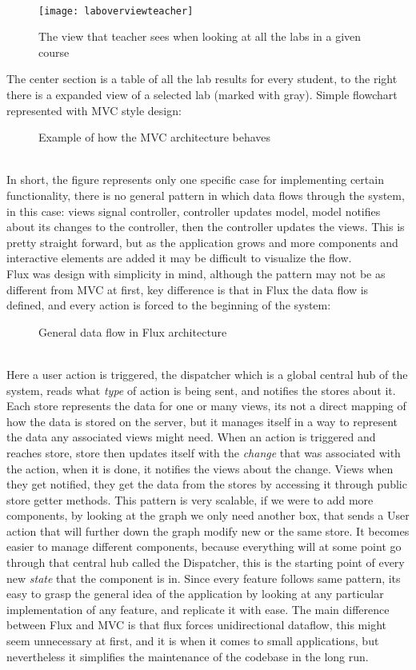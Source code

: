 \\
\begin{figure}[h]
  {\texttt{[image: laboverviewteacher]}}
  \caption{The view that teacher sees when looking at all the labs in a given course}
  \label{fig:laboverviewteacher}
\end{figure}
The center section is a table of all the lab results for every student, to the right there is a expanded view of a selected lab (marked with gray).
Simple flowchart represented with MVC style design:
\begin{figure}[h]
\centering
\scalebox{0.9}{}
\caption{Example of how the MVC architecture behaves}
\end{figure}
\\In short, the figure represents only one specific case for implementing certain functionality, there is no general pattern in which data flows through the system, in this case: views signal controller, controller updates model, model notifies about its changes to the controller, then the controller updates the views. This is pretty straight forward, but as the application grows and more components and interactive elements are added it may be difficult to visualize the flow.
\\Flux was design with simplicity in mind, although the pattern may not be as different from MVC at first, key difference is that in Flux the data flow is defined, and every action is forced to the beginning of the system:
\begin{figure}[h]
\centering
\scalebox{0.8}{{}}
\caption{General data flow in Flux architecture}
\end{figure}
\\Here a user action is triggered, the dispatcher which is a global central hub of the system, reads what \emph{type} of action is being sent, and notifies the stores about it. Each store represents the data for one or many views, its not a direct mapping of how the data is stored on the server, but it manages itself in a way to represent the data any associated views might need. When an action is triggered and reaches store, store then updates itself with the \emph{change} that was associated with the action, when it is done, it notifies the views about the change. Views when they get notified, they get the data from the stores by accessing it through public store getter methods.
This pattern is very scalable, if we were to add more components, by looking at the graph we only need another box, that sends a User action that will further down the graph modify new or the same store. It becomes easier to manage different components, because everything will at some point go through that central hub called the Dispatcher, this is the starting point of every new \emph{state} that the component is in. Since every feature follows same pattern, its easy to grasp the general idea of the application by looking at any particular implementation of any feature, and replicate it with ease. The main difference between Flux and MVC is that flux forces unidirectional dataflow, this might seem unnecessary at first, and it is when it comes to small applications, but nevertheless it simplifies the maintenance of the codebase in the long run.

